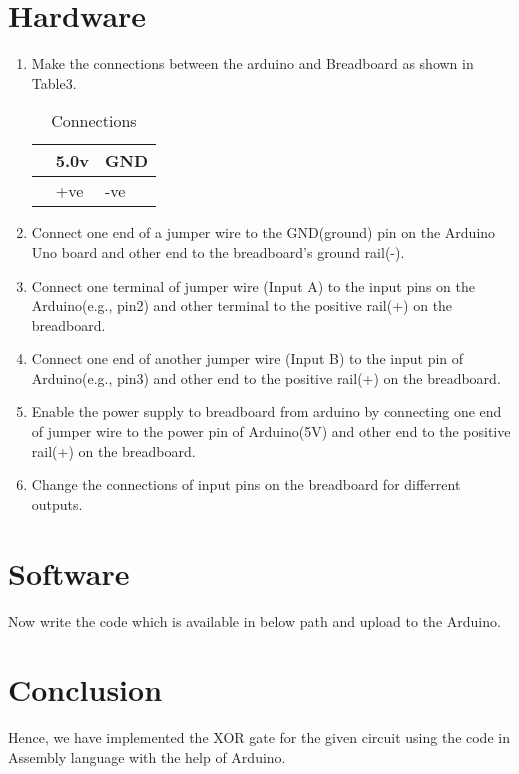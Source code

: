 \documentclass[10pt,a4paper]{article}
\begin{document}
     \section{Hardware}
	     \begin{enumerate}
		     \item Make the connections between the arduino and Breadboard as shown in Table3.
			     \begin{table}[h]
				     \centering
				     \begin{tabularx}{0.5\textwidth}
					     {
						     | >{\centering\arraybackslash}X
						     | >{\centering\arraybackslash}X
						     | >{\centering\arraybackslash}X |}
						     \hline
						     {\bf Arduino} & 5.0v & GND \\
						     \hline
						     {\bf Breadboard} & +ve & -ve  \\
						     \hline
				     \end{tabularx}
				     \caption{\label{Table-3}Connections}
			     \end{table}
		\item Connect one end of a jumper wire to the GND(ground) pin on the Arduino Uno board and other end to the breadboard’s ground rail(-).
                \item Connect one terminal of jumper wire (Input A) to the input pins on the Arduino(e.g., pin2) and other terminal to the positive rail(+) on the breadboard.
		\item Connect one end of another jumper wire (Input B) to the input pin of Arduino(e.g., pin3) and other end to the positive rail(+) on the breadboard.
		\item Enable the power supply to breadboard from arduino by connecting one end of jumper wire to the power pin of Arduino(5V) and other end to the positive rail(+) on the breadboard.
		\item Change the connections of input pins on the breadboard for differrent outputs. 
	     \end{enumerate}
     \section{Software}
	     Now write the code which is available in below path and upload to the Arduino.\\
	     \section{Conclusion}
	     Hence, we have implemented the XOR gate for the given circuit using the code in Assembly language with the help of Arduino.
\end{document}
